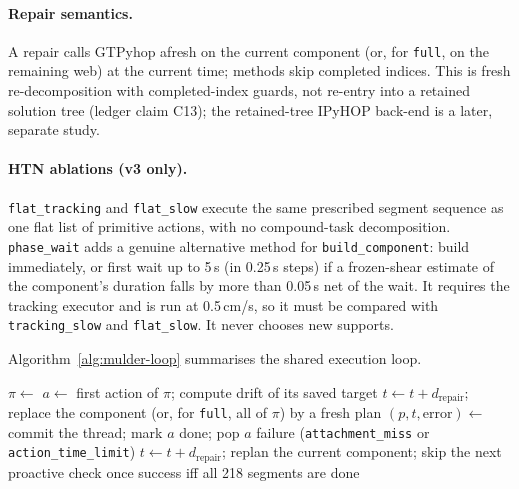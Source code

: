 \paragraph{Repair semantics.} A repair calls GTPyhop afresh on the current component (or, for
\texttt{full}, on the remaining web) at the current time; methods skip completed indices. This is
fresh re-decomposition with completed-index guards, not re-entry into a retained solution tree (ledger
claim C13); the retained-tree IPyHOP back-end is a later, separate study.

\paragraph{HTN ablations (v3 only).} \texttt{flat\_\allowbreak{}tracking} and \texttt{flat\_\allowbreak{}slow} execute the same
prescribed segment sequence as one flat list of primitive actions, with no compound-task decomposition.
\texttt{phase\_\allowbreak{}wait} adds a genuine alternative method for \texttt{build\_\allowbreak{}component}: build immediately,
or first wait up to 5\,s (in 0.25\,s steps) if a frozen-shear estimate of the component's duration
falls by more than 0.05\,s net of the wait. It requires the tracking executor and is run at 0.5\,cm/s,
so it must be compared with \texttt{tracking\_\allowbreak{}slow} and \texttt{flat\_\allowbreak{}slow}. It never chooses new supports.

Algorithm~\ref{alg:mulder-loop} summarises the shared execution loop.

\begin{algorithm}[htbp]
\caption{Shared execution loop of the six policies (\texttt{run\_\allowbreak{}trial}, \texttt{experiment.py})}
\label{alg:mulder-loop}
\begin{algorithmic}[1]
\State $\pi \gets$  
  \State $a \gets$ first action of $\pi$; compute drift of its saved target
     \State $t \gets t + d_{\text{repair}}$; replace the component (or, for \texttt{full}, all of $\pi$) by a fresh plan
  \EndIf
  \State $(p, t, \text{error}) \gets$  
     \State commit the thread; mark $a$ done; pop $a$
     \State \Return failure (\texttt{attachment\_\allowbreak{}miss} or \texttt{action\_\allowbreak{}time\_\allowbreak{}limit})
  \Else
     \State $t \gets t + d_{\text{repair}}$; replan the current component; skip the next proactive check once
  \EndIf
\EndWhile
\State \Return success iff all 218 segments are done
\end{algorithmic}
\end{algorithm}


